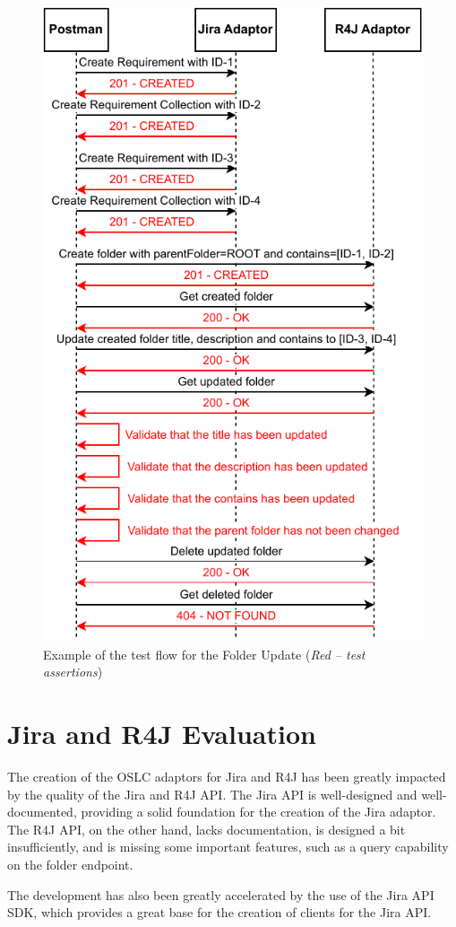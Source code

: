 \begin{figure}[H]
  \centering
  \includegraphics[width=0.7\linewidth]{figures/test-flow.pdf}
  \caption{Example of the test flow for the Folder Update (\emph{Red -- test assertions})}
  \label{fig:test_flow}
\end{figure}

\section{Jira and R4J Evaluation}
The creation of the OSLC adaptors for Jira and R4J has been greatly impacted by the quality of the Jira and R4J API. The Jira API is well-designed and well-documented, providing a solid foundation for the creation of the Jira adaptor. The R4J API, on the other hand, lacks documentation, is designed a bit insufficiently, and is missing some important features, such as a query capability on the folder endpoint.

The development has also been greatly accelerated by the use of the Jira API SDK, which provides a great base for the creation of clients for the Jira API.


